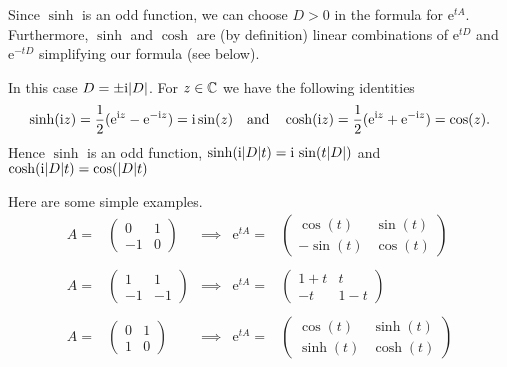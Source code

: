 \begin{description}[wide,  labelindent=0em]

\item[$D^2 > 0$: ]
Since $ \sinh $  is an odd function, we can choose  $ D > 0 $ in the formula for $  \mathrm{e}^{tA} $.
Furthermore, $ \sinh $ and $ \cosh $ are (by definition) linear combinations of $  \mathrm{e}^{tD} $ and 
$  \mathrm{e}^{-tD} $ simplifying our formula (see below).

\item[$D^2 < 0$: ] 
In this case $D = \pm \mathrm{i}|D|$.
For $ z \in \mathbb{C} $ we have the following identities
%
\[
	\sinh(\mathrm{i} z) = \frac{1}{2}(  \mathrm{e}^{\mathrm{i} z} -  \mathrm{e}^{-\mathrm{i} z}) = \mathrm{i} \sin(z)
	\quad \text{and} \quad
	\cosh(\mathrm{i} z) = \frac{1}{2}(  \mathrm{e}^{ \mathrm{i} z} +  \mathrm{e}^{- \mathrm{i} z}) = \cos(z). 
\]
%
Hence $ \sinh $ is an odd function,  $\sinh(\mathrm{i} |D| t ) = \mathrm{i} \, \sin(t|D|)$ and $\cosh(\mathrm{i} |D| t ) = \cos(|D| t )$


\end{description}
Here are some simple examples.
\newcommand{\ABC}{\begin{pmatrix}	0 & 1 \\ -1 & 0	\end{pmatrix}}
\newcommand{\BBC}{\begin{pmatrix}	\cos(t) & \sin(t) \\ - \sin(t) & \cos(t) \end{pmatrix}}
\newcommand{\CBC}{\begin{pmatrix}	1 & 1 \\ -1 & -1 \end{pmatrix}}
\newcommand{\DBC}{\begin{pmatrix}	1+t & t \\ - t & 1-t \end{pmatrix}}
\newcommand{\EBC}{\begin{pmatrix}	0 & 1 \\ 1 &0 \end{pmatrix}}
\newcommand{\FBC}{\begin{pmatrix}	\cos(t) & \sinh(t) \\ \sinh(t) & \cosh(t) \end{pmatrix}}
\[
  \begin{array}{lllll}
    A= & \ABC & \implies &  \mathrm{e}^{tA}= & \BBC \\\\
    A= & \CBC & \implies &  \mathrm{e}^{tA}= & \DBC \\\\ 
    A= & \EBC & \implies &  \mathrm{e}^{tA}= & \FBC  
  \end{array}
\]
